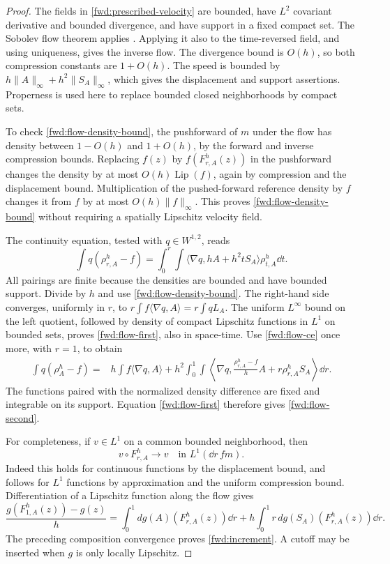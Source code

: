 \begin{proof}
The fields in \eqref{fwd:prescribed-velocity} are bounded, have
\(L^2\) covariant derivative and bounded divergence, and have support
in a fixed compact set. The Sobolev flow theorem applies
\cite[Theorems~4.3, 5.4, 6.7 and 8.3; Section~9.6]{AmbrosioTrevisan2014}. Applying it also to the time-reversed
field, and using uniqueness, gives the inverse flow. The divergence
bound is \(O(h)\), so both compression constants are \(1+O(h)\).
The speed is bounded by \(h\|A\|_\infty+h^2\|S_A\|_\infty\), which
gives the displacement and support assertions. Properness is used here
to replace bounded closed neighborhoods by compact sets.

To check \eqref{fwd:flow-density-bound}, the pushforward of \(m\)
under the flow has density between \(1-O(h)\) and \(1+O(h)\), by
the forward and inverse compression bounds. Replacing \(f(z)\) by
\(f(F^h_{r,A}(z))\) in the pushforward changes the density by at most
\(O(h)\operatorname{Lip}(f)\), again by compression and the displacement
bound. Multiplication of the pushed-forward reference density by
\(f\) changes it from \(f\) by at most \(O(h)\|f\|_\infty\).
This proves \eqref{fwd:flow-density-bound} without requiring a
spatially Lipschitz velocity field.

The continuity equation, tested with \(q\in W^{1,2}\), reads
\begin{equation}
\label{fwd:flow-ce}
 \int q(\rho^h_{r,A}-f)
 =\int_0^r\int
   \langle\nabla q,hA+h^2tS_A\rangle\rho^h_{t,A}\dd t.
\end{equation}
All pairings are finite because the densities are bounded and have
bounded support. Divide by \(h\) and use
\eqref{fwd:flow-density-bound}. The right-hand side converges,
uniformly in \(r\), to
\(r\int f\langle\nabla q,A\rangle=r\int qL_A\).
The uniform \(L^\infty\) bound on the left quotient, followed by
density of compact Lipschitz functions in \(L^1\) on bounded sets,
proves \eqref{fwd:flow-first}, also in space-time. Use
\eqref{fwd:flow-ce} once more, with \(r=1\), to obtain
\begin{align*}
 \int q(\rho^h_A-f)
 ={}&h\int f\langle\nabla q,A\rangle
 +h^2\int_0^1\int
   \left\langle\nabla q,
    \frac{\rho^h_{r,A}-f}{h}A+r\rho^h_{r,A}S_A\right\rangle\dd r.
\end{align*}
The functions paired with the normalized density difference are
fixed and integrable on its support. Equation
\eqref{fwd:flow-first} therefore gives \eqref{fwd:flow-second}.

For completeness, if \(v\in L^1\) on a common bounded neighborhood,
then
\[
 v\circ F^h_{r,A}\longrightarrow v
 \quad\text{in }L^1(\dd r\,fm).
\]
Indeed this holds for continuous functions by the displacement
bound, and follows for \(L^1\) functions by approximation and the
uniform compression bound. Differentiation of a Lipschitz function
along the flow gives
\[
 \frac{g(F^h_{1,A}(z))-g(z)}h
 =\int_0^1 dg(A)(F^h_{r,A}(z))\dd r
  +h\int_0^1r\,dg(S_A)(F^h_{r,A}(z))\dd r.
\]
The preceding composition convergence proves
\eqref{fwd:increment}. A cutoff may be inserted when \(g\) is only
locally Lipschitz.
\end{proof}

